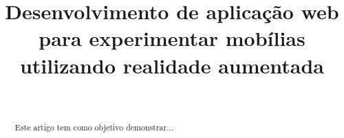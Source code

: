 \documentclass[conference]{IEEEtran}
\begin{document}
\title{Desenvolvimento de aplicação web para experimentar mobílias utilizando realidade aumentada\\
}

\author{
   \\

}

\maketitle

\begin{abstract}
  Este artigo tem como objetivo demonstrar...
\end{abstract}
\end{document}
